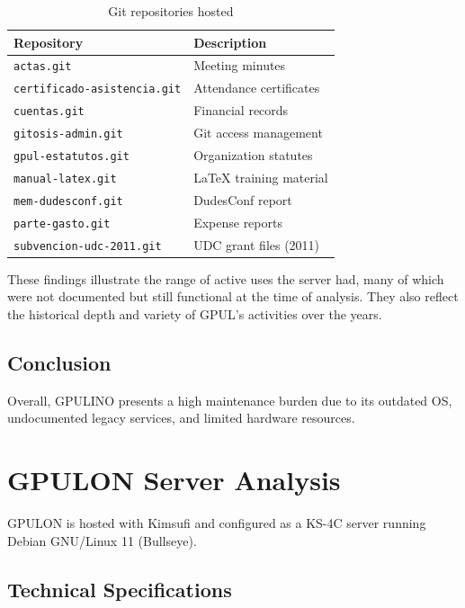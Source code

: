 \begin{table}[H]
  \centering
  \caption{Git repositories hosted}
  \label{tab:gpulino_git_repos}
  \begin{tabular}{ll}
    \rowcolor{udcpink!25}
    \textbf{Repository} & \textbf{Description} \\
    \hline
    \texttt{actas.git} & Meeting minutes \\
    \texttt{certificado-asistencia.git} & Attendance certificates \\
    \texttt{cuentas.git} & Financial records \\
    \texttt{gitosis-admin.git} & Git access management \\
    \texttt{gpul-estatutos.git} & Organization statutes \\
    \texttt{manual-latex.git} & LaTeX training material \\
    \texttt{mem-dudesconf.git} & DudesConf report \\
    \texttt{parte-gasto.git} & Expense reports \\
    \texttt{subvencion-udc-2011.git} & UDC grant files (2011) \\
  \end{tabular}
\end{table}

These findings illustrate the range of active uses the server had, many of which were not documented but still functional at the time of analysis. They also reflect the historical depth and variety of GPUL's activities over the years.

\subsection{Conclusion}

Overall, GPULINO presents a high maintenance burden due to its outdated OS, undocumented legacy services, and limited hardware resources.

\section{GPULON Server Analysis}

GPULON is hosted with Kimsufi and configured as a KS-4C server running Debian GNU/Linux 11 (Bullseye).

\subsection{Technical Specifications}

